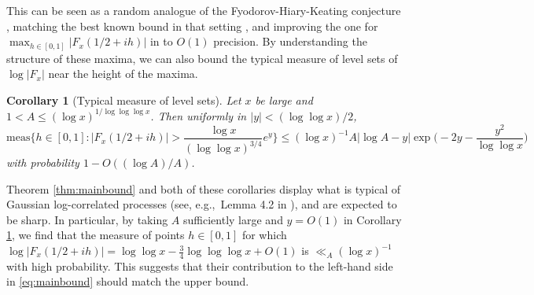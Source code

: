 \documentclass{amsart}
\newtheorem{cor}[theorem]{Corollary}
\theoremstyle{definition}
\theoremstyle{remark}
\numberwithin{equation}{section}
\begin{document}
\noindent This can be seen as a random analogue of the Fyodorov-Hiary-Keating conjecture \cite{FyodorovHiaryKeating,FyodorovKeating}, matching the best known bound in that setting \cite{FHK1}, and improving the one for $\max_{h\in [0,1]}|F_x(1/2+ih)|$ in \cite{ABH} to $O(1)$ precision. By understanding the structure of these maxima, we can also bound the typical measure of level sets of $\log |F_x|$ near the height of the maxima.
\begin{cor}[Typical measure of level sets]\label{cor:level} Let $x$ be large and {$1<A\leq (\log x)^{1/\log\log\log x}$}. Then uniformly in $|y|<(\log\log x)/2$,
\[
\mathrm{meas}\Big\{h\in [0,1]: |F_x(1/2+ih)|>\frac{\log x}{(\log\log x)^{3/4}}e^y\Big\}\leq (\log x)^{-1}A|\log A-y|\exp{\Big(\!-2y-\frac{y^2}{\log\log x}\Big)}
\]
with probability $1-O((\log A)/A)$.
\end{cor}
\noindent Theorem \ref{thm:mainbound} and both of these corollaries display what is typical of Gaussian log-correlated processes (see, e.g.,\ Lemma 4.2 in \cite{CHL}), and are expected to be sharp. In particular, by taking $A$ sufficiently large and $y=O(1)$ in Corollary \ref{cor:level}, we find that the measure of points $h\in [0,1]$ for which $\log|F_x(1/2+ih)|=\log\log x-\frac{3}{4}\log\log\log x+O(1)$ is  $\ll_A(\log x)^{-1}$ with high probability. This suggests that their contribution to the left-hand side in \eqref{eq:mainbound} should match the upper bound.


\end{document}
